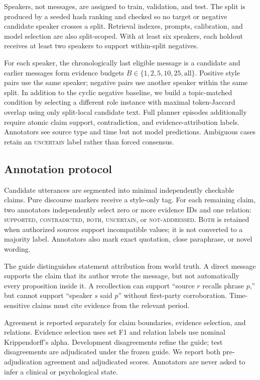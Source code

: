 \documentclass[11pt,a4paper]{article}
\begin{document}
Speakers, not messages, are assigned to train, validation, and test.  The split
is produced by a seeded hash ranking and checked so no target or negative
candidate speaker crosses a split.  Retrieval indexes, prompts, calibration,
and model selection are also split-scoped.  With at least six speakers, each
holdout receives at least two speakers to support within-split negatives.

For each speaker, the chronologically last eligible message is a candidate and
earlier messages form evidence budgets $B\in\{1,2,5,10,25,\mathrm{all}\}$.
Positive style pairs use the same speaker; negative pairs use another speaker
within the same split.  In addition to the cyclic negative baseline, we build a
topic-matched condition by selecting a different role instance with maximal
token-Jaccard overlap using only split-local candidate text.  Full planner episodes additionally require atomic claim
support, contradiction, and evidence-attribution labels.  Annotators see source
type and time but not model predictions.  Ambiguous cases retain an
\textsc{uncertain} label rather than forced consensus.

\subsection{Annotation protocol}

Candidate utterances are segmented into minimal independently checkable claims.
Pure discourse markers receive a style-only tag.  For each remaining claim, two
annotators independently select zero or more evidence IDs and one relation:
\textsc{supported}, \textsc{contradicted}, \textsc{both},
\textsc{uncertain}, or \textsc{not-addressed}.  \textsc{Both} is retained when
authorized sources support incompatible values; it is not converted to a
majority label.  Annotators also mark exact quotation, close paraphrase, or
novel wording.

The guide distinguishes statement attribution from world truth.  A direct
message supports the claim that its author wrote the message, but not
automatically every proposition inside it.  A recollection can support
``source $r$ recalls phrase $p$,'' but cannot support ``speaker $s$ said $p$''
without first-party corroboration.  Time-sensitive claims must cite evidence
from the relevant period.

Agreement is reported separately for claim boundaries, evidence selection, and
relations.  Evidence selection uses set F1 and relation labels use nominal
Krippendorff's alpha.  Development disagreements refine the guide; test
disagreements are adjudicated under the frozen guide.  We report both
pre-adjudication agreement and adjudicated scores.  Annotators are never asked
to infer a clinical or psychological state.
\end{document}
